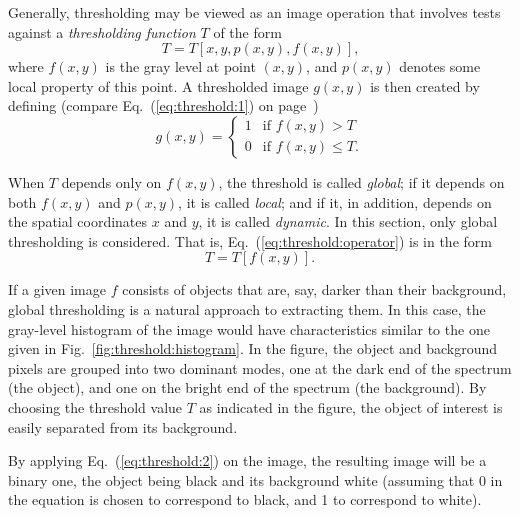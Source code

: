 Generally, thresholding may be viewed as an image operation that
involves tests against a {\em thresholding function\/} $T$ of the form
\begin{equation}
\label{eq:threshold:operator}
  T=T[x,y,p(x,y),f(x,y)]\mbox{,}
\end{equation}
where $f(x,y)$ is the gray level at point $(x,y)$, and $p(x,y)$
denotes some local property of this point.  A thresholded image
$g(x,y)$ is then created by defining (compare
Eq.~(\ref{eq:threshold:1}) on page~\pageref{eq:threshold:1})
\begin{equation}
\label{eq:threshold:2}
  g(x,y)=\left\{
    \begin{array}{ll}
      1 & \mbox{if $f(x,y)>T$} \\
      0 & \mbox{if $f(x,y)\leq T$.}
    \end{array}\right.
\end{equation}

When $T$ depends only on $f(x,y)$, the threshold is called {\em
  global\/}; if it depends on both $f(x,y)$ and $p(x,y)$, it is called
{\em local\/}; and if it, in addition, depends on the spatial
coordinates $x$ and $y$, it is called {\em dynamic\/}.  In this
section, only global thresholding is considered.  That is,
Eq.~(\ref{eq:threshold:operator}) is in the form
\begin{equation}
  T=T[f(x,y)]\mbox{.}
\end{equation}

If a given image $f$ consists of objects that are, say, darker than
their background, global thresholding is a natural approach to
extracting them.  In this case, the gray-level histogram of the image
would have characteristics similar to the one given in
Fig.~\ref{fig:threshold:histogram}.  In the figure, the object and
background pixels are grouped into two dominant modes, one at the dark
end of the spectrum (the object), and one on the bright end of the
spectrum (the background).
By choosing the threshold value $T$ as indicated in the figure, the
object of interest is easily separated from its background.

By applying Eq.~(\ref{eq:threshold:2}) on the image, the resulting
image will be a binary one, the object being black and its background
white (assuming that 0 in the equation is chosen to correspond to
black, and 1 to correspond to white).

